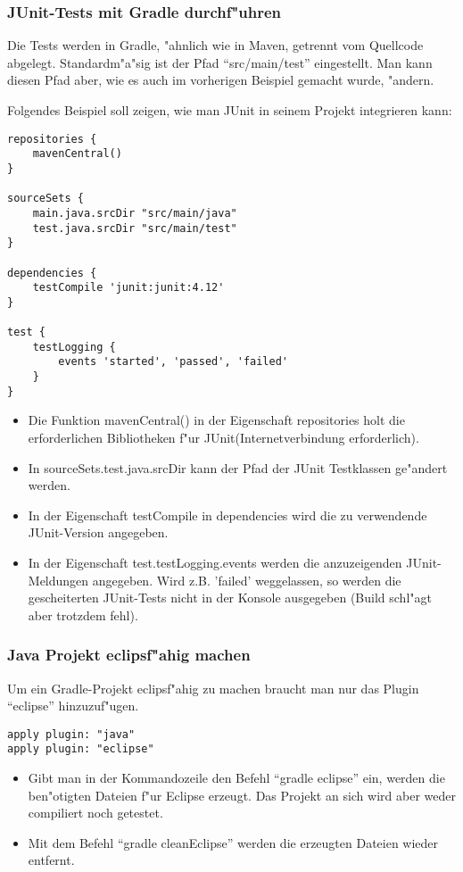 \subsubsection{JUnit-Tests mit Gradle durchf"uhren}
Die Tests werden in Gradle, "ahnlich wie in Maven, getrennt vom Quellcode abgelegt. Standardm"a"sig ist der Pfad ``src/main/test'' eingestellt. Man kann diesen Pfad aber, wie es auch im vorherigen Beispiel gemacht wurde, "andern.

Folgendes Beispiel soll zeigen, wie man JUnit in seinem Projekt integrieren kann:
\begin{verbatim}
repositories {
    mavenCentral()
}

sourceSets {
    main.java.srcDir "src/main/java"
    test.java.srcDir "src/main/test"
}

dependencies {
    testCompile 'junit:junit:4.12'
}

test {
    testLogging {
        events 'started', 'passed', 'failed'
    }
}
\end{verbatim}
\begin{itemize}
\item Die Funktion mavenCentral() in der Eigenschaft repositories holt die erforderlichen Bibliotheken f"ur JUnit(Internetverbindung erforderlich).
\item In sourceSets.test.java.srcDir kann der Pfad der JUnit Testklassen ge"andert werden.
\item In der Eigenschaft testCompile in dependencies wird die zu verwendende JUnit-Version angegeben.
\item In der Eigenschaft test.testLogging.events werden die anzuzeigenden JUnit-Meldungen angegeben. Wird z.B. 'failed' weggelassen, so werden die gescheiterten JUnit-Tests nicht in der Konsole ausgegeben (Build schl"agt aber trotzdem fehl).
\end{itemize}

\subsubsection{Java Projekt eclipsf"ahig machen}
Um ein Gradle-Projekt eclipsf"ahig zu machen braucht man nur das Plugin ``eclipse'' hinzuzuf"ugen.
\begin{verbatim}
apply plugin: "java"
apply plugin: "eclipse"
\end{verbatim}

\begin{itemize}
\item Gibt man in der Kommandozeile den Befehl ``gradle eclipse'' ein, werden die ben"otigten Dateien f"ur Eclipse erzeugt. Das Projekt an sich wird aber weder compiliert noch getestet.
\item Mit dem Befehl ``gradle cleanEclipse'' werden die erzeugten Dateien wieder entfernt.
\end{itemize}
